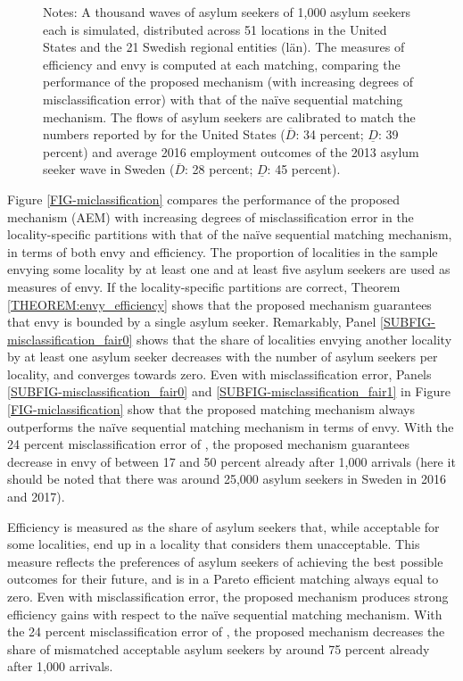\documentclass[12pt,fleqn]{article}
\begin{document}
\begin{figure}
	{\scriptsize \vspace{-1em}
	\begin{singlespace}
		{\sc Notes:} A thousand waves of asylum seekers of 1,000 asylum seekers each is simulated, distributed across 51 locations in the United States and the 21 Swedish regional entities (l{\"a}n). The measures of efficiency and envy is computed at each matching, comparing the performance of the proposed mechanism (with increasing degrees of misclassification error) with that of the na\"{i}ve sequential matching mechanism. The flows of asylum seekers are calibrated to match the numbers reported by \cite{bib:BansakEtAl} for the United States ($\overline{D}$: 34 percent; $\underline{D}$: 39 percent) and average 2016 employment outcomes of the 2013 asylum seeker wave in Sweden ($\overline{D}$: 28 percent; $\underline{D}$: 45 percent).
	\end{singlespace}
	 }
\end{figure}

Figure \ref{FIG-miclassification} compares the performance of the proposed mechanism (AEM) with increasing degrees of misclassification error in the locality-specific partitions with that of the na\"{i}ve sequential matching mechanism, in terms of both envy and efficiency. The proportion of localities in the sample envying some locality by at least one and at least five asylum seekers are used as measures of envy. If the locality-specific partitions are correct, Theorem \ref{THEOREM:envy_efficiency} shows that the proposed mechanism guarantees that envy is bounded by a single asylum seeker. Remarkably, Panel \ref{SUBFIG-misclassification_fair0} shows that the share of localities envying another locality by at least one asylum seeker decreases with the number of asylum seekers per locality, and converges towards zero. Even with misclassification error, Panels \ref{SUBFIG-misclassification_fair0} and \ref{SUBFIG-misclassification_fair1} in Figure \ref{FIG-miclassification} show that the proposed matching mechanism always outperforms the na\"{i}ve sequential matching mechanism in terms of envy. With the 24 percent misclassification error of \cite{bib:BansakEtAl}, the proposed mechanism guarantees decrease in envy of between 17 and 50 percent already after 1,000 arrivals (here it should be noted that there was around 25,000 asylum seekers in Sweden in 2016 and 2017).

Efficiency is measured as the share of asylum seekers that, while acceptable for some localities, end up in a locality that considers them unacceptable. This measure reflects the preferences of asylum seekers of achieving the best possible outcomes for their future, and is in a Pareto efficient matching always equal to zero. Even with misclassification error, the proposed mechanism produces strong efficiency gains with respect to the na\"{i}ve sequential matching mechanism. With the 24 percent misclassification error of \cite{bib:BansakEtAl}, the proposed mechanism decreases the share of mismatched acceptable asylum seekers by around 75 percent already after 1,000 arrivals.
\end{document}

